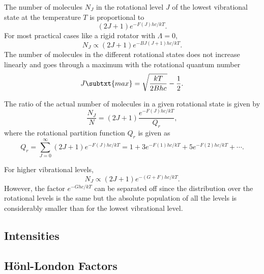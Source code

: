 The number of molecules $N_J$ in the rotational level $J$ of the lowest vibrational state at the temperature $T$ is proportional to
\begin{equation*}
    (2J + 1)e^{-F(J)hc/kT}.
\end{equation*}
For most practical cases like a rigid rotator with $\Lambda = 0$,
\begin{equation*}
    N_J \propto (2J + 1)e^{-BJ(J + 1)hc/kT}.
\end{equation*}
The number of molecules in the different rotational states does not increase linearly and goes through a maximum with the rotational quantum number
\begin{equation*}
    J\subtxt{max} = \sqrt{\frac{kT}{2Bhc}} - \frac{1}{2}.
\end{equation*}

The ratio of the actual number of molecules in a given rotational state is given by
\begin{equation*}
    \frac{N_J}{N} = (2J + 1)\frac{e^{-F(J)hc/kT}}{Q_r},
\end{equation*}
where the rotational partition function $Q_r$ is given as
\begin{equation}
    Q_r = \sum_{J=0}^{\infty}(2J + 1)e^{-F(J)hc/kT} = 1 + 3e^{-F(1)hc/kT} + 5e^{-F(2)hc/kT} + \dotsb.
\end{equation}

For higher vibrational levels,
\begin{equation}
    N_J \propto (2J + 1)e^{-(G + F)hc/kT}.
\end{equation}
However, the factor $e^{-Ghc/kT}$ can be separated off since the distribution over the rotational levels is the same but the absolute population of all the levels is considerably smaller than for the lowest vibrational level.

\subsection{Intensities}

\subsection{H\"onl-London Factors}

